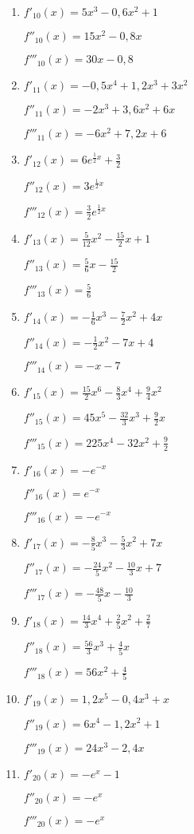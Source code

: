 \begin{Answer}[ref=hoehereAbleitungenA1]
\begin{enumerate}[label=\alph*)]
		\item \(f'_{10}(x)=5x^3-0,6x^2+1\)

		\(f''_{10}(x)=15x^2-0,8x\)

		\(f'''_{10}(x)=30x-0,8\)

		\item \(f'_{11}(x)=-0,5x^4+1,2x^3+3x^2\)

		\(f''_{11}(x)=-2x^3+3,6x^2+6x\)

		\(f'''_{11}(x)=-6x^2+7,2x+6\)

		\item \(f'_{12}(x)=6e^{\frac{1}{2}x}+\frac{3}{2}\)

		\(f''_{12}(x)=3e^{\frac{1}{2}x}\)

		\(f'''_{12}(x)=\frac{3}{2}e^{\frac{1}{2}x}\)

		\item \(f'_{13}(x)=\frac{5}{12}x^2-\frac{15}{2}x+1\)

		\(f''_{13}(x)=\frac{5}{6}x-\frac{15}{2}\)

		\(f'''_{13}(x)=\frac{5}{6}\)

		\item \(f'_{14}(x)=-\frac{1}{6}x^3-\frac{7}{2}x^2+4x\)

		\(f''_{14}(x)=-\frac{1}{2}x^2-7x+4\)

		\(f'''_{14}(x)=-x-7\)

		\item \(f'_{15}(x)=\frac{15}{2}x^6-\frac{8}{3}x^4+\frac{9}{4}x^2\)

		\(f''_{15}(x)=45x^5-\frac{32}{3}x^3+\frac{9}{2}x\)

		\(f'''_{15}(x)=225x^4-32x^2+\frac{9}{2}\)

		\item \(f'_{16}(x)=-e^{-x}\)

		\(f''_{16}(x)=e^{-x}\)

		\(f'''_{16}(x)=-e^{-x}\)

		\item \(f'_{17}(x)=-\frac{8}{5}x^3-\frac{5}{3}x^2+7x\)

		\(f''_{17}(x)=-\frac{24}{5}x^2-\frac{10}{3}x+7\)

		\(f'''_{17}(x)=-\frac{48}{5}x-\frac{10}{3}\)

		\item \(f'_{18}(x)=\frac{14}{3}x^4+\frac{2}{5}x^2+\frac{2}{7}\)

		\(f''_{18}(x)=\frac{56}{3}x^3+\frac{4}{5}x\)

		\(f'''_{18}(x)=56x^2+\frac{4}{5}\)

		\item \(f'_{19}(x)=1,2x^5-0,4x^3+x\)

		\(f''_{19}(x)=6x^4-1,2x^2+1\)

		\(f'''_{19}(x)=24x^3-2,4x\)

		\item \(f'_{20}(x)=-e^{x}-1\)

		\(f''_{20}(x)=-e^{x}\)

		\(f'''_{20}(x)=-e^{x}\)
	\end{enumerate}
\end{Answer}